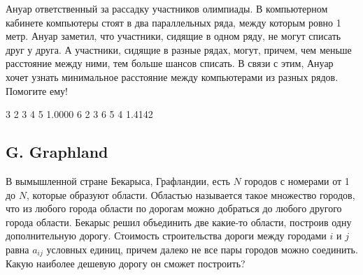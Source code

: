 Ануар ответственный за рассадку участников олимпиады. В компьютерном кабинете компьютеры стоят в два параллельных ряда, между которым ровно 1 метр. Ануар заметил, что участники, сидящие в одном ряду, не могут списать друг у друга. А участники, сидящие в разные рядах, могут, причем, чем меньше расстояние между ними, тем больше шансов списать. В связи с этим, Ануар хочет узнать минимальное расстояние между компьютерами из разных рядов. Помогите ему!



\examplee
{3  2 3   4 5}
{1.0000}
{6  2 3 6 5 4  }
{1.4142}



\subsection*{G. Graphland}


В вымышленной стране Бекарыса, Графландии, есть $N$ городов с номерами от 1 до $N$, которые образуют области. Областью называется такое множество городов, что из любого города области по дорогам можно добраться до любого другого города области. Бекарыс решил объединить две какие-то области, построив одну дополнительную дорогу. Стоимость строительства дороги между городами $i$ и $j$ равна $a_{ij}$ условных единиц, причем далеко не все пары городов можно соединить. Какую наиболее дешевую дорогу он сможет построить?


